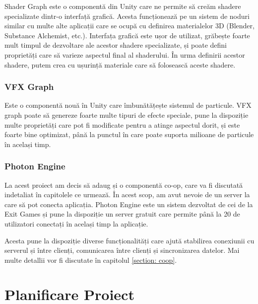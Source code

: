 \documentclass[12pt, a4paper]{article}
\begin{document}
	Shader Graph este o componentă din Unity care ne permite să creăm shadere specializate dintr-o interfață grafică. Acesta funcționează pe un sistem de noduri similar cu multe alte aplicații care se ocupă cu definirea materialelor 3D (Blender, Substance Alchemist, etc.). Interfața grafică este ușor de utilizat, grăbește foarte mult timpul de dezvoltare ale acestor shadere specializate, și poate defini proprietăți care să varieze aspectul final al shaderului. În urma definirii acestor shadere, putem crea cu ușurință materiale care să folosească aceste shadere.
	
	
	
	
	
	\subsubsection{VFX Graph}
	
	Este o componentă nouă în Unity care îmbunătățește sistemul de particule. VFX graph poate să genereze foarte multe tipuri de efecte speciale, pune la dispoziție multe proprietăți care pot fi modificate pentru a atinge aspectul dorit, și este foarte bine optimizat, până la punctul în care poate suporta milioane de particule în același timp.
	
	
	
	
	
	\subsubsection{Photon Engine}
	
	La acest proiect am decis să adaug și o componentă co-op, care va fi discutată indetaliat în capitolele ce urmează. În acest scop, am avut nevoie de un server la care să pot conecta aplicația. Photon Engine este un sistem dezvoltat de cei de la Exit Games și pune la dispoziție un server gratuit care permite până la 20 de utilizatori conectați în același timp la aplicație.
	\newline
	
	Acesta pune la dispoziție diverse funcționalități care ajută stabilirea conexiunii cu serverul și între clienți, comunicarea între clienți și sincronizarea datelor. Mai multe detallii vor fi discutate în capitolul \ref{section: coop}.
	
	
	
	
	
	\section{Planificare Proiect}
\end{document}
